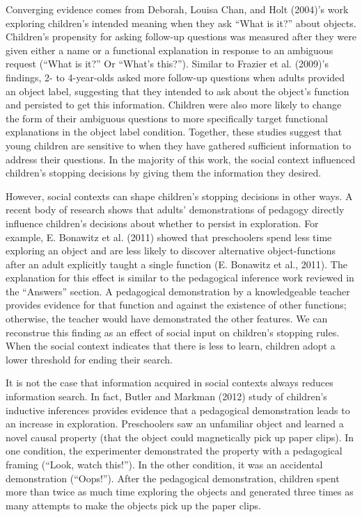 \documentclass[english,floatsintext,man]{apa6}
\theoremstyle{definition}
\theoremstyle{definition}
\theoremstyle{definition}
\theoremstyle{remark}
\begin{document}
Converging evidence comes from Deborah, Louisa Chan, and Holt (2004)'s
work exploring children's intended meaning when they ask \enquote{What
is it?} about objects. Children's propensity for asking follow-up
questions was measured after they were given either a name or a
functional explanation in response to an ambiguous request
(\enquote{What is it?} Or \enquote{What's this?}). Similar to Frazier et
al. (2009)'s findings, 2- to 4-year-olds asked more follow-up questions
when adults provided an object label, suggesting that they intended to
ask about the object's function and persisted to get this information.
Children were also more likely to change the form of their ambiguous
questions to more specifically target functional explanations in the
object label condition. Together, these studies suggest that young
children are sensitive to when they have gathered sufficient information
to address their questions. In the majority of this work, the social
context influenced children's stopping decisions by giving them the
information they desired.

However, social contexts can shape children's stopping decisions in
other ways. A recent body of research shows that adults' demonstrations
of pedagogy directly influence children's decisions about whether to
persist in exploration. For example, E. Bonawitz et al. (2011) showed
that preschoolers spend less time exploring an object and are less
likely to discover alternative object-functions after an adult
explicitly taught a single function (E. Bonawitz et al., 2011). The
explanation for this effect is similar to the pedagogical inference work
reviewed in the \enquote{Answers} section. A pedagogical demonstration
by a knowledgeable teacher provides evidence for that function and
against the existence of other functions; otherwise, the teacher would
have demonstrated the other features. We can reconstrue this finding as
an effect of social input on children's stopping rules. When the social
context indicates that there is less to learn, children adopt a lower
threshold for ending their search.

It is not the case that information acquired in social contexts always
reduces information search. In fact, Butler and Markman (2012) study of
children's inductive inferences provides evidence that a pedagogical
demonstration leads to an increase in exploration. Preschoolers saw an
unfamiliar object and learned a novel causal property (that the object
could magnetically pick up paper clips). In one condition, the
experimenter demonstrated the property with a pedagogical framing
(\enquote{Look, watch this!}). In the other condition, it was an
accidental demonstration (\enquote{Oops!}). After the pedagogical
demonstration, children spent more than twice as much time exploring the
objects and generated three times as many attempts to make the objects
pick up the paper clips.
\end{document}

